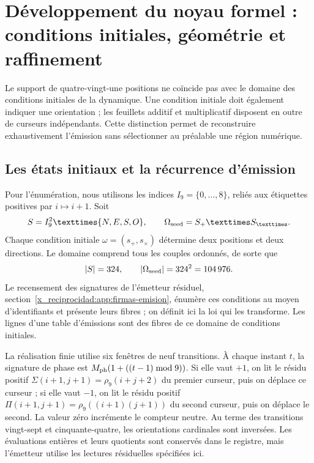 \section{Développement du noyau formel : conditions initiales, géométrie et raffinement}
\label{x_reciprocidad:sec:extension}

Le support de quatre-vingt-une positions ne coïncide pas avec le domaine des conditions initiales de la dynamique. Une condition initiale doit également indiquer une orientation ; les feuillets additif et multiplicatif disposent en outre de curseurs indépendants. Cette distinction permet de reconstruire exhaustivement l’émission sans sélectionner au préalable une région numérique.

\subsection{Les états initiaux et la récurrence d’émission}

Pour l’énumération, nous utilisons les indices \(I_9=\{0,\ldots,8\}\), reliés aux étiquettes positives par \(i\mapsto i+1\). Soit
\[
 \mathcal S=I_9^2\times\{N,E,S,O\},\qquad
 \Omega_{\rm seed}=\mathcal S_+\times\mathcal S_\times.
\]
Chaque condition initiale \(\omega=(s_+,s_\times)\) détermine deux positions et deux directions. Le domaine comprend tous les couples ordonnés, de sorte que
\begin{equation}
 |\mathcal S|=324,\qquad |\Omega_{\rm seed}|=324^2=104\,976.
 \label{x_reciprocidad:eq:semillas}
\end{equation}
Le recensement des signatures de l'émetteur résiduel, section~\ref{x_reciprocidad:app:firmas-emision}, énumère ces conditions au moyen d'identifiants et présente leurs fibres ; on définit ici la loi qui les transforme. Les lignes d'une table d'émissions sont des fibres de ce domaine de conditions initiales.

La réalisation finie utilise six fenêtres de neuf transitions. À chaque instant \(t\), la signature de phase est \(M_{\rm ph}(1+((t-1)\bmod9))\). Si elle vaut \(+1\), on lit le résidu positif \(\Sigma(i+1,j+1)=\rho_9(i+j+2)\) du premier curseur, puis on déplace ce curseur ; si elle vaut \(-1\), on lit le résidu positif \(\Pi(i+1,j+1)=\rho_9((i+1)(j+1))\) du second curseur, puis on déplace le second. La valeur zéro incrémente le compteur neutre. Au terme des transitions vingt-sept et cinquante-quatre, les orientations cardinales sont inversées. Les évaluations entières et leurs quotients sont conservés dans le registre, mais l’émetteur utilise les lectures résiduelles spécifiées ici.

